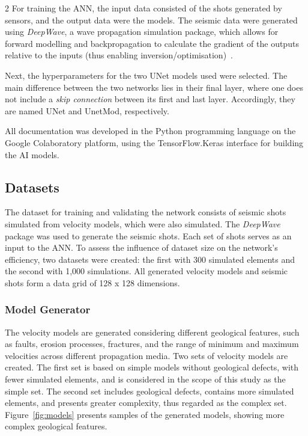 \documentclass[a4paper,twoside,12pt]{article}
\begin{document}
\begin{multicols}{2}
For training the ANN, the input data consisted of the shots generated by sensors, and the output data were the models. The seismic data were generated using \textit{DeepWave}, a wave propagation simulation package, which allows for forward modelling and backpropagation to calculate the gradient of the outputs relative to the inputs (thus enabling inversion/optimisation)~\cite{deepwave}.

Next, the hyperparameters for the two UNet models used were selected. The main difference between the two networks lies in their final layer, where one does not include a \textit{skip connection} between its first and last layer. Accordingly, they are named UNet and UnetMod, respectively.

All documentation was developed in the Python programming language on the Google Colaboratory platform, using the TensorFlow.Keras interface for building the AI models.

\subsection{Datasets}

The dataset for training and validating the network consists of seismic shots simulated from velocity models, which were also simulated. The \textit{DeepWave} package was used to generate the seismic shots. Each set of shots serves as an input to the ANN. To assess the influence of dataset size on the network's efficiency, two datasets were created: the first with 300 simulated elements and the second with 1,000 simulations. All generated velocity models and seismic shots form a data grid of 128 x 128 dimensions.

\subsubsection{Model Generator}

The velocity models are generated considering different geological features, such as faults, erosion processes, fractures, and the range of minimum and maximum velocities across different propagation media. Two sets of velocity models are created. The first set is based on simple models without geological defects, with fewer simulated elements, and is considered in the scope of this study as the simple set. The second set includes geological defects, contains more simulated elements, and presents greater complexity, thus regarded as the complex set. Figure~\ref{fig:models} presents samples of the generated models, showing more complex geological features.


\end{multicols}
\end{document}
